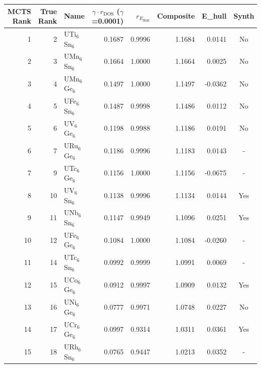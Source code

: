 \begin{tabular}{rrlrrrrc}
\toprule
MCTS Rank & True Rank & Name & $\gamma \cdot r_{\mathrm{DOS}}$ ($\gamma$=0.0001) & $r_{E_{\mathrm{Hull}}}$ & Composite & E\_hull & Synth \\
\midrule
1 & 2 & UTi$_{6}$Sn$_{6}$ & 0.1687 & 0.9996 & 1.1684 & 0.0141 & No \\
2 & 3 & UMn$_{6}$Sn$_{6}$ & 0.1664 & 1.0000 & 1.1664 & 0.0025 & No \\
3 & 4 & UMn$_{6}$Ge$_{6}$ & 0.1497 & 1.0000 & 1.1497 & -0.0362 & No \\
4 & 5 & UFe$_{6}$Sn$_{6}$ & 0.1487 & 0.9998 & 1.1486 & 0.0112 & No \\
5 & 6 & UV$_{6}$Ge$_{6}$ & 0.1198 & 0.9988 & 1.1186 & 0.0191 & No \\
6 & 7 & URu$_{6}$Ge$_{6}$ & 0.1186 & 0.9996 & 1.1183 & 0.0143 & - \\
7 & 9 & UTc$_{6}$Ge$_{6}$ & 0.1156 & 1.0000 & 1.1156 & -0.0675 & - \\
8 & 10 & UV$_{6}$Sn$_{6}$ & 0.1138 & 0.9996 & 1.1134 & 0.0144 & Yes \\
9 & 11 & UNb$_{6}$Sn$_{6}$ & 0.1147 & 0.9949 & 1.1096 & 0.0251 & Yes \\
10 & 12 & UFe$_{6}$Ge$_{6}$ & 0.1084 & 1.0000 & 1.1084 & -0.0260 & - \\
11 & 14 & UTc$_{6}$Sn$_{6}$ & 0.0992 & 0.9999 & 1.0991 & 0.0069 & - \\
12 & 15 & UCo$_{6}$Ge$_{6}$ & 0.0912 & 0.9997 & 1.0909 & 0.0132 & Yes \\
13 & 16 & UNi$_{6}$Ge$_{6}$ & 0.0777 & 0.9971 & 1.0748 & 0.0227 & No \\
14 & 17 & UCr$_{6}$Ge$_{6}$ & 0.0997 & 0.9314 & 1.0311 & 0.0361 & Yes \\
15 & 18 & URh$_{6}$Sn$_{6}$ & 0.0765 & 0.9447 & 1.0213 & 0.0352 & - \\
\bottomrule
\end{tabular}
